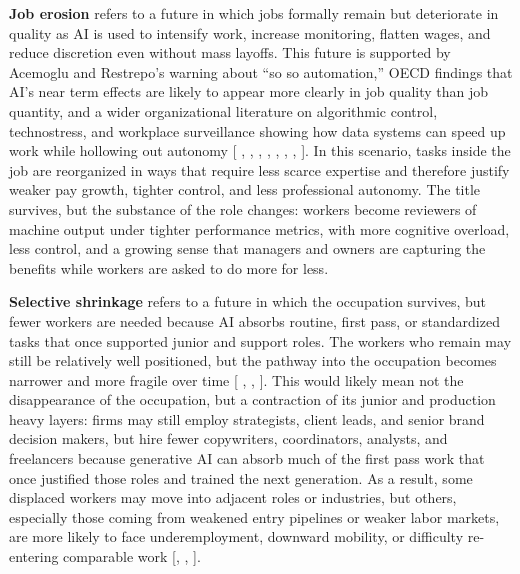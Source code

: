 \documentclass[sigconf,authordraft]{acmart}
\begin{document}
\textbf{Job erosion} refers to a future in which jobs formally remain but deteriorate in quality as AI is used to intensify work, increase monitoring, flatten wages, and reduce discretion even without mass layoffs. This future is supported by Acemoglu and Restrepo’s warning about “so so automation,” OECD findings that AI’s near term effects are likely to appear more clearly in job quality than job quantity, and a wider organizational literature on algorithmic control, technostress, and workplace surveillance showing how data systems can speed up work while hollowing out autonomy [\cite{acemoglu2019automation} , \cite{acemoglu2022tasks},  \cite{oecd2023employment}, \cite{kellogg2020algorithms}, \cite{tarafdar2007technostress}, \cite{dubal2023algorithmic}, \cite{mateescu2019algorithmic}, \cite{rogers2023data}]. In this scenario, tasks inside the job are reorganized in ways that require less scarce expertise and therefore justify weaker pay growth, tighter control, and less professional autonomy. The title survives, but the substance of the role changes: workers become reviewers of machine output under tighter performance metrics, with more cognitive overload, less control, and a growing sense that managers and owners are capturing the benefits while workers are asked to do more for less.

\textbf{Selective shrinkage} refers to a future in which the occupation survives, but fewer workers are needed because AI absorbs routine, first pass, or standardized tasks that once supported junior and support roles. The workers who remain may still be relatively well positioned, but the pathway into the occupation becomes narrower and more fragile over time [\cite{acemoglu2026building} ,  \cite{acemoglu2019automation} , \cite{acemoglu2022tasks}]. This would likely mean not the disappearance of the occupation, but a contraction of its junior and production heavy layers: firms may still employ strategists, client leads, and senior brand decision makers, but hire fewer copywriters, coordinators, analysts, and freelancers because generative AI can absorb much of the first pass work that once justified those roles and trained the next generation. As a result, some displaced workers may move into adjacent roles or industries, but others, especially those coming from weakened entry pipelines or weaker labor markets, are more likely to face underemployment, downward mobility, or difficulty re-entering comparable work [\cite{acemoglu2026building},  \cite{acemoglu2019automation}, \cite{rogers2023data}].
\end{document}
